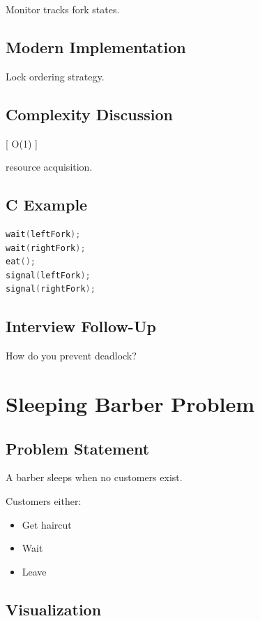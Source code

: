 Monitor tracks fork states.

\subsection{Modern Implementation}

Lock ordering strategy.

\subsection{Complexity Discussion}

[
O(1)
]

resource acquisition.

\subsection{C Example}

\begin{lstlisting}[language=C,style=interviewcode]
wait(leftFork);
wait(rightFork);
eat();
signal(leftFork);
signal(rightFork);
\end{lstlisting}

\subsection{Interview Follow-Up}

How do you prevent deadlock?

\section{Sleeping Barber Problem}

\subsection{Problem Statement}

A barber sleeps when no customers exist.

Customers either:

\begin{itemize}
\item Get haircut
\item Wait
\item Leave
\end{itemize}

\subsection{Visualization}

